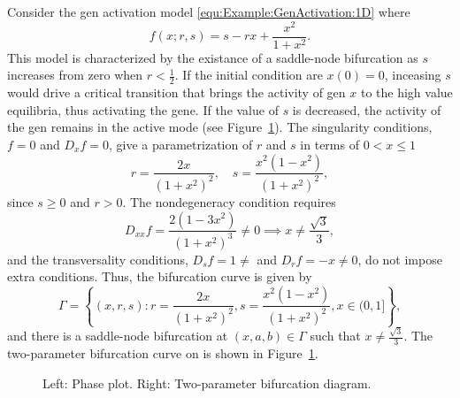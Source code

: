 \documentclass[12pt]{article}
\begin{document}
Consider the gen activation model \eqref{equ:Example:GenActivation:1D} where 
\[f(x;r,s)=s-rx+\frac{x^{2}}{1+x^{2}}.\]
This model is characterized by the existance of a saddle-node bifurcation as $s$ increases from zero when $r<\tfrac{1}{2}$. If the initial condition are $x(0)=0$, inceasing $s$ would drive a critical transition that brings the activity of gen $x$ to the high value equilibria, thus activating the gene. If the value of $s$ is decreased, the activity of the gen remains in the active mode (see Figure~\ref{fig:Example:GenActivation}).
The singularity conditions, $f=0$ and $D_{x}f=0$, give a parametrization of $r$ and $s$ in terms of $0< x\leq 1$
\[
r=\frac{2x}{(1+x^{2})^{2}}, \quad s = \frac{x^{2}(1-x^{2})}{(1+x^{2})^{2}},
\]
since $s\geq0$ and $r>0$. The nondegeneracy condition requires
\[
D_{xx}f = \frac{2(1-3x^{2})}{(1+x^{2})^{3}}\neq 0 \implies x\neq \frac{\sqrt{3}}{3},
\]
and the transversality conditions, $D_{s}f=1\neq$ and $D_{r}f=-x\neq 0 $, do not impose extra conditions. Thus, the bifurcation curve is given by
\begin{equation}
    \Gamma = \left\{ (x,r,s) : r=\frac{2x}{(1+x^{2})^{2}}, s = \frac{x^{2}(1-x^{2})}{(1+x^{2})^{2}}, x\in (0,1]\right\},
    \label{equ:Example:GenActivation:Gamma}
\end{equation}
and there is a saddle-node bifurcation at $(x,a,b)\in\Gamma$ such that $x\neq\frac{\sqrt{3}}{3}$. The two-parameter bifurcation curve on is shown in Figure~\ref{fig:Example:GenActivation}.


\begin{figure}
    \begin{center}
    \end{center}
    \caption{Left: Phase plot. Right: Two-parameter bifurcation diagram.}
    \label{fig:Example:GenActivation}
\end{figure}
\end{document}
